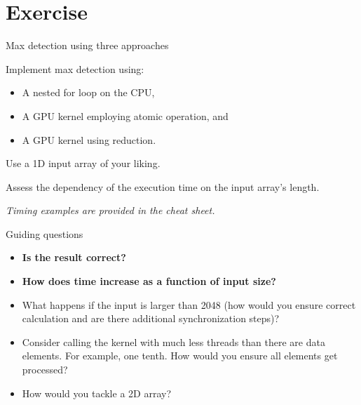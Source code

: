 \documentclass[11pt,t]{beamer}
\begin{document}
\section{Exercise}

\begin{frame}{Max detection using three approaches} 

    Implement max detection using:
    \vspace{1mm}
    \begin{itemize}\setlength\itemsep{0.75em}
        \item A nested for loop on the CPU,
        \item A GPU kernel employing atomic operation, and
        \item A GPU kernel using reduction.
    \end{itemize}
    
    \vspace{3mm}
    
    Use a 1D input array of your liking.
    
    \vspace{3mm}
    
    Assess the dependency of the execution time on the input array's length.
    
    \vspace{3mm}

    \textit{Timing examples are provided in the cheat sheet.}

\end{frame}


\begin{frame}{Guiding questions} 

    \begin{itemize}\setlength\itemsep{1em}
        \item \textbf{Is the result correct?}
        \item \textbf{How does time increase as a function of input size?}
        \item What happens if the input is larger than 2048 (how would you ensure correct calculation and are there additional synchronization steps)?
        \item Consider calling the kernel with much less threads than there are data elements. For example, one tenth. How would you ensure all elements get processed?
        \item How would you tackle a 2D array?
    \end{itemize}

\end{frame}
\end{document}
